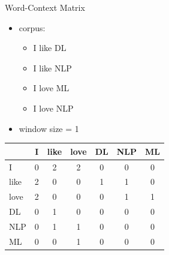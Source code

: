 \documentclass[12pt, handout]{beamer}
\begin{document}
\begin{frame}{Word-Context Matrix}
	\begin{itemize}
		\item corpus:
		\begin{itemize}
			\item I like DL
			\item I like NLP
			\item I love ML
			\item I love NLP
		\end{itemize}
		\item window size = 1
		
	\end{itemize}
	{
		\begin{table}[!h]
			\centering
			\begin{tabular}{l|cccccc}
				&  I & like & love & DL & NLP &ML  \\
				\hline
				I & 0 & 2 & 2 & 0 &0 &0  \\
				like & 2 & 0 & 0 & 1 & 1 &0 \\
				love & 2 & 0 & 0 & 0 & 1 & 1 \\
				DL & 0 & 1 & 0 & 0 & 0 & 0 \\
				NLP & 0 & 1 & 1 & 0 & 0  & 0\\
				ML & 0 & 0 & 1 & 0 & 0 & 0\\
				\hline
			\end{tabular}
		\end{table}
	}
\end{frame}
\end{document}
